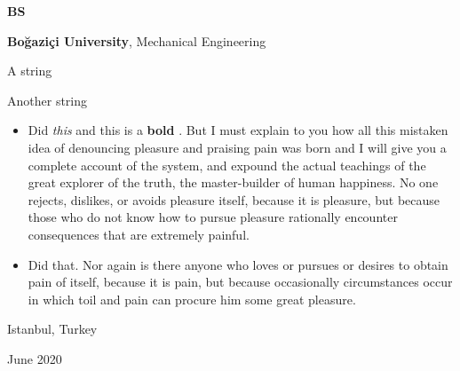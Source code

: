\documentclass[10pt, letterpaper]{article}
\newenvironment{summary}{
    \begin{description}[
        topsep=0.10 cm,
        parsep=0.10 cm,
        partopsep=0pt,
        itemsep=0pt,
        leftmargin=0.4 cm + 10pt
    ]
}{
    \end{description}
} %
\newenvironment{highlights}{
    \begin{itemize}[
        topsep=0.10 cm,
        parsep=0.10 cm,
        partopsep=0pt,
        itemsep=0pt,
        leftmargin=0.4 cm + 10pt
    ]
}{
    \end{itemize}
} %
\newenvironment{threecolentry}[3][]{
    \onecolentry
    \def\thirdColumn{#3}
    \setcolumnwidth{1 cm, \fill, 4.5 cm}
    \begin{paracol}{3}
    {\raggedright #2} \switchcolumn
}{
    \switchcolumn \raggedleft \thirdColumn
    \end{paracol}
    \endonecolentry
} %
\let\hrefWithoutArrow\href
\renewcommand{\href}[2]{\hrefWithoutArrow{#1}{\ifthenelse{\equal{#2}{}}{ }{#2 }\raisebox{.15ex}{\footnotesize \faExternalLink*}}}
\begin{document}
        \vspace{0.2 cm}

        \begin{threecolentry}{\textbf{BS}}{
            Istanbul, Turkey

        June 2020
        }
            \textbf{Boğaziçi University}, Mechanical Engineering
            \begin{summary}
                \item A string
                \item Another string
            \end{summary}
            \begin{highlights}
                \item Did \textit{this} and this is a \textbf{bold} \href{https://example.com}{link}. But I must explain to you how all this mistaken idea of denouncing pleasure and praising pain was born and I will give you a complete account of the system, and expound the actual teachings of the great explorer of the truth, the master-builder of human happiness. No one rejects, dislikes, or avoids pleasure itself, because it is pleasure, but because those who do not know how to pursue pleasure rationally encounter consequences that are extremely painful.
                \item Did that. Nor again is there anyone who loves or pursues or desires to obtain pain of itself, because it is pain, but because occasionally circumstances occur in which toil and pain can procure him some great pleasure.
            \end{highlights}
        \end{threecolentry}

        \vspace{0.2 cm}
\end{document}
